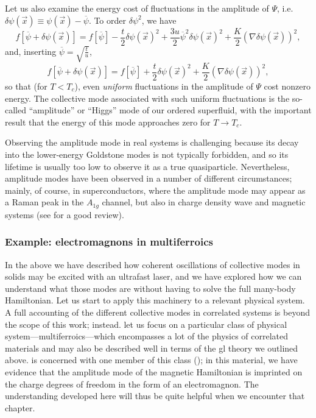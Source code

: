 Let us also examine the energy cost of fluctuations in the amplitude of $\Psi$, i.e. $\delta \psi(\vec{x}) \equiv \psi(\vec{x})-\overline{\psi}$.
To order $\delta \psi^2$, we have
\begin{equation}
f[\overline{\psi}+\delta\psi(\vec{x})] = f[\overline{\psi}]-\frac{t}{2}\delta\psi(\vec{x})^2+\frac{3u}{2}\overline{\psi}^2\delta\psi(\vec{x})^2+\frac{K}{2}(\nabla \delta \psi(\vec{x}))^2,
\end{equation}
and, inserting $\overline{\psi} = \sqrt{\frac{t}{u}}$,
\begin{equation}
f[\overline{\psi}+\delta\psi(\vec{x})] = f[\overline{\psi}]+\frac{t}{2}\delta\psi(\vec{x})^2+\frac{K}{2}(\nabla \delta \psi(\vec{x}))^2,
\end{equation}
so that (for $T<T_c$), even \emph{uniform} fluctuations in the amplitude of $\Psi$ cost nonzero energy.
The collective mode associated with such uniform fluctuations is the so-called ``amplitude'' or ``Higgs'' mode of our ordered superfluid, with the important result that the energy of this mode approaches zero for $T\rightarrow T_c$.

Observing the amplitude mode in real systems is challenging because its decay into the lower-energy Goldstone modes is not typically forbidden, and so its lifetime is usually too low to observe it as a true quasiparticle\cite{jain_higgs_2017}.
Nevertheless, amplitude modes have been observed in a number of different circumstances; mainly, of course, in superconductors, where the amplitude mode may appear as a Raman peak in the $A_{1g}$ channel\citep{measson_amplitude_2014}, but also in charge density wave\citep{wang_axial_2022} and magnetic\citep{hong_higgs_2017,jain_higgs_2017} systems (see \citet{pekker_amplitudehiggs_2015} for a good review).

\subsubsection{Example: electromagnons in multiferroics}

In the above we have described how coherent oscillations of collective modes in solids may be excited with an ultrafast laser, and we have explored how we can understand what those modes are without having to solve the full many-body Hamiltonian.
Let us start to apply this machinery to a relevant physical system.
A full accounting of the different collective modes in correlated systems is beyond the scope of this work; instead. let us focus on a particular class of physical system---multiferroics---which encompasses a lot of the physics of correlated materials and may also be described well in terms of the \gls{gl} theory we outlined above.
 is concerned with one member of this class (); in this material, we have evidence that the amplitude mode of the magnetic Hamiltonian is imprinted on the charge degrees of freedom in the form of an electromagnon.
The understanding developed here will thus be quite helpful when we encounter that chapter.

